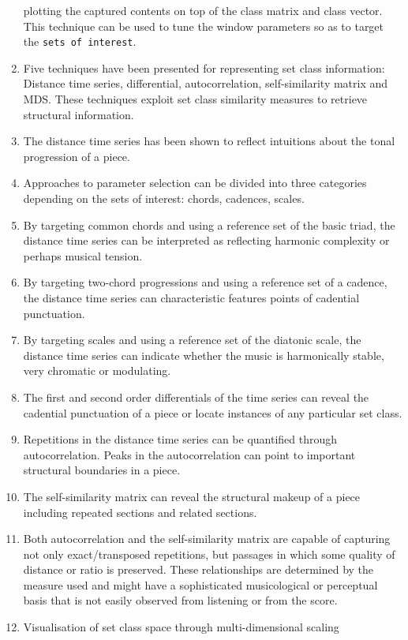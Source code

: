 \documentclass{article}
\begin{document}
\begin{enumerate}
    plotting the captured contents on top of the class matrix and
    class vector. This technique can be used to tune the window
    parameters so as to target the \texttt{sets of interest}.
\item Five techniques have been presented for representing set class
    information: Distance time series, differential, autocorrelation,
    self-similarity matrix and MDS. These techniques exploit set class
    similarity measures to retrieve structural information.
\item The distance time series has been shown to reflect intuitions about
    the tonal progression of a piece.
\item Approaches to parameter selection can be divided into three
    categories depending on the sets of interest: chords, cadences,
    scales.
\item By targeting common chords and using a reference set of the basic
    triad, the distance time series can be interpreted as reflecting
    harmonic complexity or perhaps musical tension.
\item By targeting two-chord progressions and using a reference set of a
    cadence, the distance time series can characteristic features
    points of cadential punctuation.
\item By targeting scales and using a reference set of the diatonic
    scale, the distance time series can indicate whether the music is
    harmonically stable, very chromatic or modulating.
\item The first and second order differentials of the time series can
    reveal the cadential punctuation of a piece or locate instances of
    any particular set class.
\item Repetitions in the distance time series can be quantified through
    autocorrelation. Peaks in the autocorrelation can point to
    important structural boundaries in a piece.
\item The self-similarity matrix can reveal the structural makeup of a
    piece including repeated sections and related sections.
\item Both autocorrelation and the self-similarity matrix are capable of
    capturing not only exact/transposed repetitions, but passages in
    which some quality of distance or ratio is preserved. These
    relationships are determined by the measure used and might have a
    sophisticated musicological or perceptual basis that is not easily
    observed from listening or from the score.
\item Visualisation of set class space through multi-dimensional scaling

\end{enumerate}
\end{document}
